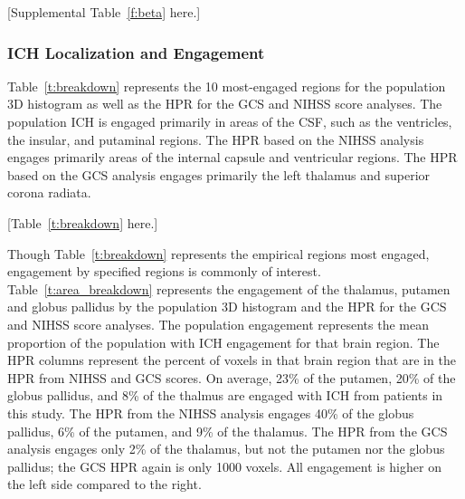 \documentclass[10pt]{article}\usepackage[]{graphicx}\usepackage[]{color}
\begin{document}
[Supplemental Table~\ref{f:beta} here.]








\subsubsection{ICH Localization and Engagement}
Table~\ref{t:breakdown} represents the 10 most-engaged regions for the population 3D histogram as well as the HPR for the GCS and NIHSS score  analyses.  The population ICH is engaged primarily in areas of the CSF, such as the ventricles, the insular, and putaminal regions. The HPR based on the NIHSS analysis engages primarily areas of the internal capsule and ventricular regions. The HPR based on the GCS analysis engages primarily the left thalamus and superior corona radiata.

[Table~\ref{t:breakdown} here.]

Though Table~\ref{t:breakdown} represents the empirical regions most engaged, engagement by specified regions is commonly of interest.  Table~\ref{t:area_breakdown} represents the engagement of the thalamus, putamen and globus pallidus by the population 3D histogram and the HPR for the GCS and NIHSS score analyses.  The population engagement represents the mean proportion of the population with ICH engagement for that brain region. The HPR columns represent the percent of voxels in that brain region that are in the HPR from NIHSS and GCS scores. On average, 23\% of the putamen, 20\% of the globus pallidus, and 8\% of the thalmus are engaged with ICH from patients in this study. The HPR from the NIHSS analysis engages 40\% of the globus pallidus, 6\% of the putamen, and 9\% of the thalamus. The HPR from the GCS analysis engages only 2\% of the thalamus, but not the putamen nor the globus pallidus; the GCS HPR again is only 1000 voxels. All engagement is higher on the left side compared to the right. 
\end{document}

